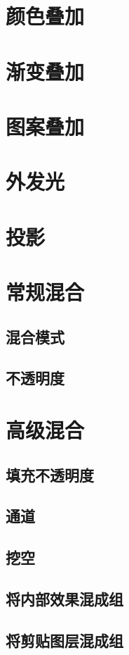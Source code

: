 \section{颜色叠加}
\newpage
\section{渐变叠加}
\newpage
\section{图案叠加}
\newpage
\section{外发光}
\newpage
\section{投影}
\newpage
\section{常规混合}
\subsection{混合模式}
\subsection{不透明度}
\newpage
\section{高级混合}
\subsection{填充不透明度}
\newpage
\subsection{通道}
\newpage
\subsection{挖空}
\newpage
\subsection{将内部效果混成组}
\newpage
\subsection{将剪贴图层混成组}
\newpage

